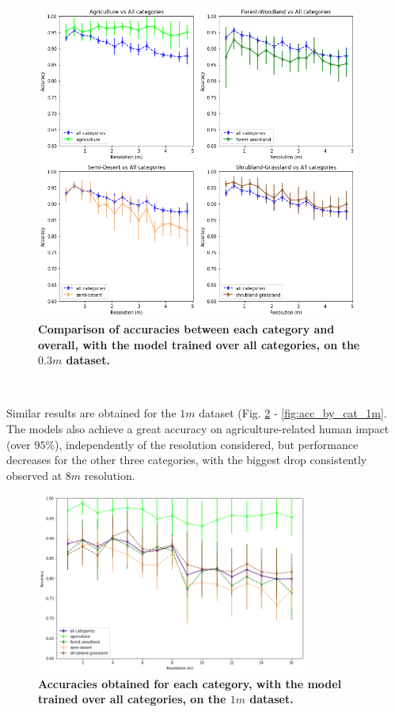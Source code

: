 \begin{figure}[H]
	\centering
	\includegraphics[width=0.95\textwidth]{Figures/results/acc_res_by_category_03m.png}
	\captionsetup{width=1\linewidth}
	\caption{\textbf{Comparison of accuracies between each category and overall, with the model trained over all categories, on the $0.3m$ dataset.}}
	\label{fig:acc_by_cat_03m}
\end{figure}

\

Similar results are obtained for the $1m$ dataset (Fig. \ref{fig:acc_all_cat_1m} - \ref{fig:acc_by_cat_1m}. The models also achieve a great accuracy on agriculture-related human impact (over $95\%$), independently of the resolution considered, but performance decreases for the other three categories, with the biggest drop consistently observed at $8m$ resolution. 

\begin{figure}[H]
	\centering
	\includegraphics[width=0.8\textwidth]{Figures/results/acc_res_all_categories_1m.png}
	\captionsetup{width=1\linewidth}
	\caption{\textbf{Accuracies obtained for each category, with the model trained over all categories, on the $1m$ dataset.}}
	\label{fig:acc_all_cat_1m}
\end{figure}

